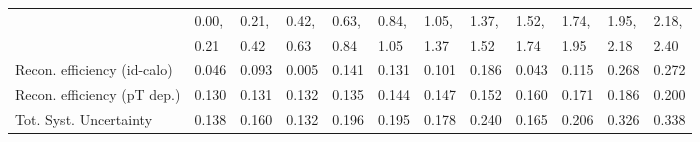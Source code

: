 \begin{tabular}{l|p{0.6cm}p{0.6cm}p{0.6cm}p{0.6cm}p{0.6cm}p{0.6cm}p{0.6cm}p{0.6cm}p{0.6cm}p{0.6cm}p{0.6cm}}
\hline
   & 0.00, & 0.21, & 0.42, & 0.63, & 0.84, & 1.05, & 1.37, & 1.52, & 1.74, & 1.95, & 2.18,  \\ 
   & 0.21 & 0.42 & 0.63 & 0.84 & 1.05 & 1.37 & 1.52 & 1.74 & 1.95 & 2.18 & 2.40  \\ 
\hline
Recon. efficiency (id-calo)              & 0.046 & 0.093 & 0.005 & 0.141 & 0.131 & 0.101 & 0.186 & 0.043 & 0.115 & 0.268 & 0.272 \\
\hline
Recon. efficiency (pT dep.)              & 0.130 & 0.131 & 0.132 & 0.135 & 0.144 & 0.147 & 0.152 & 0.160 & 0.171 & 0.186 & 0.200 \\
\hline
Tot. Syst. Uncertainty                   & 0.138 & 0.160 & 0.132 & 0.196 & 0.195 & 0.178 & 0.240 & 0.165 & 0.206 & 0.326 & 0.338 \\
\hline
\end{tabular}
